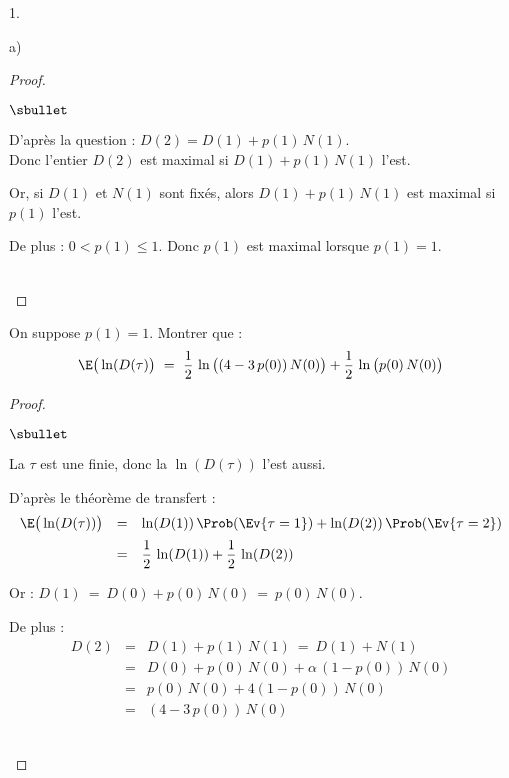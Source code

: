 \documentclass[11pt]{article}%
\begin{document}
\begin{noliste}{1.}
\begin{noliste}{a)}
    \begin{proof}~
     \begin{noliste}{$\sbullet$}
      \item D'après la question  : $D(2) = D(1) + p(1) \, 
      N(1)$.\\
      Donc l'entier $D(2)$ est maximal si $D(1)+p(1) \, N(1)$ l'est.
      
      \item Or, si $D(1)$ et $N(1)$ sont fixés, alors $D(1)+p(1) \, 
      N(1)$ est maximal si $p(1)$ l'est.
      
      \item De plus : $0< p(1) \leq 1$. Donc $p(1)$ est maximal 
      lorsque $p(1)=1$.
     \end{noliste}
     ~\\[-1cm]
    \end{proof}

    
    \item On suppose $p(1)=1$. Montrer que :
    \[
      \E\big(\ln(D(\tau)\big) \ = \ \dfrac{1}{2} \, \ln\big((4-3 \, 
      p(0)) \, N(0)\big) + \dfrac{1}{2} \, \ln\big(p(0) \, N(0)\big)
    \]
    
    \begin{proof}~
      \begin{noliste}{$\sbullet$}
	\item La \var $\tau$ est une \var finie, donc la \var $\ln(
	D(\tau))$ l'est aussi.
	
	\item D'après le théorème de transfert :
	\[
	  \begin{array}{rcl}
	    \E\big(\ln(D(\tau))\big) &=& \ln(D(1)) \, \Prob(\Ev{\tau
	    =1}) + \ln(D(2)) \, \Prob(\Ev{\tau =2})
	    \\[.2cm]
	    &=& \dfrac{1}{2} \, \ln(D(1)) + \dfrac{1}{2} \, \ln(D(2))
	  \end{array}
	\]
	
	\item Or : $D(1) \ = \ D(0) + p(0) \, N(0) \ = \ p(0) \, N(0)$.
	
	\item De plus : 
	\[
	  \begin{array}{rcl}
	    D(2) &=& D(1) + p(1) \, N(1) \ = \ D(1) + N(1)
	    \\[.2cm]
	    &=& D(0) + p(0) \, N(0) + \alpha \, (1-p(0)) \, N(0)
	    \\[.2cm]
	    &=& p(0) \, N(0) + 4(1-p(0)) \, N(0)
	    \\[.2cm]
	    &=& (4-3 \, p(0)) \, N(0)
	  \end{array}
	\]
      \end{noliste}
      ~\\[-1cm]
    \end{proof}
    

\end{noliste}
\end{noliste}
\end{document}
